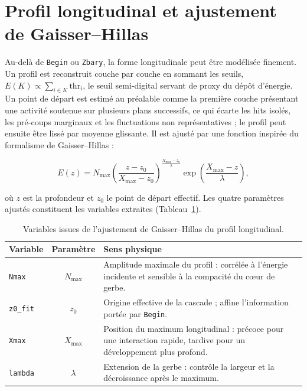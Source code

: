 \section{Profil longitudinal et ajustement de Gaisser--Hillas}
\label{annexe:gaisserhillas}

Au-delà de \texttt{Begin} ou \texttt{Zbary}, la forme longitudinale peut être modélisée finement. Un profil est reconstruit couche par couche en sommant les seuils, \(E(K)\propto \sum_{i\in K} \mathrm{thr}_i\), le seuil semi-digital servant de proxy du dépôt d'énergie. Un point de départ est estimé au préalable comme la première couche présentant une activité soutenue sur plusieurs plans successifs, ce qui écarte les hits isolés, les pré-coups marginaux et les fluctuations non représentatives ; le profil peut ensuite être lissé par moyenne glissante. Il est ajusté par une fonction inspirée du formalisme de Gaisser--Hillas :

\[
E(z)=
N_{\max}
\left(
\frac{z-z_0}{X_{\max}-z_0}
\right)^{
\frac{X_{\max}-z_0}{\lambda}
}
\exp\!\left(
\frac{X_{\max}-z}{\lambda}
\right),
\]

où \(z\) est la profondeur et \(z_0\) le point de départ effectif. Les quatre paramètres ajustés constituent les variables extraites (Tableau~\ref{tab:annexeA-gh}).

\begin{table}[!ht]
    \centering
    \caption{Variables issues de l'ajustement de Gaisser--Hillas du profil longitudinal.}
    \label{tab:annexeA-gh}
    \small
    \begin{tabularx}{\textwidth}{@{}l c X@{}}
        \toprule
        \textbf{Variable} & \textbf{Paramètre} & \textbf{Sens physique} \\
        \midrule
        \texttt{Nmax} & \(N_{\max}\)
            & Amplitude maximale du profil : corrélée à l'énergie incidente et sensible à la
              compacité du cœur de gerbe. \\[2pt]
        \texttt{z0\_fit} & \(z_0\)
            & Origine effective de la cascade ; affine l'information portée par \texttt{Begin}. \\[2pt]
        \texttt{Xmax} & \(X_{\max}\)
            & Position du maximum longitudinal : précoce pour une interaction rapide, tardive pour
              un développement plus profond. \\[2pt]
        \texttt{lambda} & \(\lambda\)
            & Extension de la gerbe : contrôle la largeur et la décroissance après le maximum. \\
        \bottomrule
    \end{tabularx}
\end{table}

